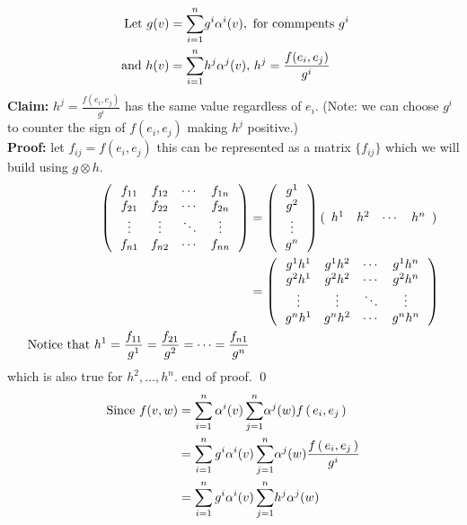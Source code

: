 \documentclass[10pt,a4paper]{report}
\begin{document}
\begin{enumerate}[label=3.\arabic*.]
{\begin{itemize}
	\begin{align*}
		\text{Let } g(v)&=\underset{i=1}{\overset{n}{\sum}} g^i\alpha^i(v), \text{ for commpents } g^i \\
		\text{ and } h(v)&= \underset{i=1}{\overset{n}{\sum}} h^j\alpha^j(v), \, h^j = \frac{f(e_i, e_j)}{g^i}
	\end{align*}\textbf{Claim: } $h^j = \frac{f(e_i, e_j)}{g^i}$ has the same value regardless of $e_i$.  (Note: we can choose $g^i$ to counter the sign of $f(e_i, e_j)$ making $h^j$ positive.)\\
	\textbf{Proof: }let $f_{ij} = f(e_i, e_j)$ this can be represented as a matrix $\{ f_{ij} \}$ which we will build using $g \otimes h$.
	\begin{align*}
		\left (\, \begin{array}{cccc}
			f_{11} & f_{12} & \cdots & f_{1n} \\
			f_{21} & f_{22} & \cdots & f_{2n} \\
			\vdots & \vdots & \ddots & \vdots \\
			f_{n1} & f_{n2} & \cdots & f_{nn} \\
		\end{array}
		 \,\right ) &= \left (\, \begin{array}{c}
			g^1\\
			g^2\\
			\vdots\\
			g^n
		\end{array}
		 \,\right )(\begin{array}{cccccccccc}  h^1 & h^2 & \cdots & h^n  \end{array})\\
		&=		\left (\, \begin{array}{cccc}
			g^1h^1 & g^1h^2 & \cdots & g^1h^n \\
			g^2h^1 & g^2h^2 & \cdots & g^2h^n \\
			\vdots & \vdots & \ddots & \vdots \\
			g^nh^1 & g^nh^2 & \cdots & g^nh^n \\		\end{array}  \,\right )\\
			\text{Notice that } h^1 = \frac{f_{11}}{g^1} = \frac{f_{21}}{g^2} = \cdots = \frac{f_{n1}}{g^n}
	\end{align*}which is also true for $h^2, \dots, h^n$.  end of proof. \qed
	\begin{align*}
		\text{Since } f(v,w) &= \sum_{i=1}^n \alpha^i(v)\, \SUM{j=1}{n} \alpha^j(w) f\PAREN{e_i, e_j}\\
		&= \sum_{i=1}^n g^i \alpha^i(v)\, \SUM{j=1}{n} \alpha^j(w) \frac{f\PAREN{e_i, e_j}}{g^i}\\
		&= \sum_{i=1}^n g^i \alpha^i(v)\, \SUM{j=1}{n} h^j \alpha^j(w)\\

\end{align*}
\end{itemize}}
\end{enumerate}
\end{document}
